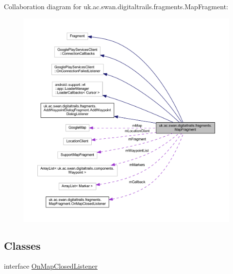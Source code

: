 Collaboration diagram for uk.\+ac.\+swan.\+digitaltrails.\+fragments.\+Map\+Fragment\+:\nopagebreak
\begin{figure}[H]
\begin{center}
\leavevmode
\includegraphics[width=350pt]{classuk_1_1ac_1_1swan_1_1digitaltrails_1_1fragments_1_1_map_fragment__coll__graph}
\end{center}
\end{figure}
\subsection*{Classes}
\begin{DoxyCompactItemize}
\item 
interface \hyperlink{interfaceuk_1_1ac_1_1swan_1_1digitaltrails_1_1fragments_1_1_map_fragment_1_1_on_map_closed_listener}{On\+Map\+Closed\+Listener}
\end{DoxyCompactItemize}
